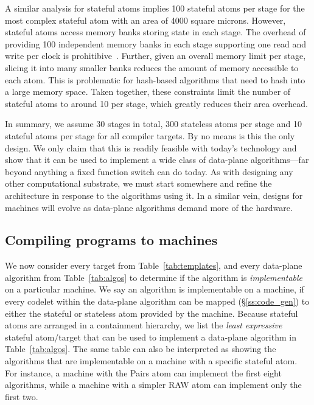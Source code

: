 A similar analysis for stateful atoms implies 100 stateful atoms per stage for
the most complex stateful atom with an area of 4000 square microns.  However,
stateful atoms access memory banks storing state in each stage. The overhead of
providing 100 independent memory banks in each stage supporting one read and
write per clock is prohitibive~\cite{private_conversations_with_mike}.
Further, given an overall memory limit per stage, slicing it into many smaller
banks reduces the amount of memory accessible to each atom. This is problematic
for hash-based algorithms that need to hash into a large memory space. Taken
together, these constraints limit the number of stateful atoms to around 10 per
stage, which greatly reduces their area overhead.

In summary, we assume 30 stages in total, 300 stateless atoms per stage and 10
stateful atoms per stage for all compiler targets. By no means is this the only
design. We only claim that this is readily feasible with today's technology and
show that it can be used to implement a wide class of data-plane
algorithms---far beyond anything a fixed function switch can do today. As with
designing any other computational substrate, we must start somewhere and refine
the architecture in response to the algorithms using it.  In a similar vein,
designs for \absmachine machines will evolve as data-plane algorithms demand
more of the hardware.


\subsection{Compiling \pktlanguage programs to \absmachine machines}

We now consider every target from Table~\ref{tab:templates}, and every
data-plane algorithm from Table~\ref{tab:algos} to determine if the algorithm
is \textit{implementable} on a particular \absmachine machine. We say an
algorithm is implementable on a \absmachine machine, if every codelet within
the data-plane algorithm can be mapped (\S\ref{ss:code_gen}) to either the
stateful or stateless atom provided by the \absmachine machine. Because
stateful atoms are arranged in a containment hierarchy, we list the
\textit{least expressive} stateful atom/target that can be used to implement a
data-plane algorithm in Table~\ref{tab:algos}. The same table can also be
interpreted as showing the algorithms that are implementable on a \absmachine
machine with a specific stateful atom. For instance, a \absmachine machine with
the Pairs atom can implement the first eight algorithms, while a machine with a
simpler RAW atom can implement only the first two.

